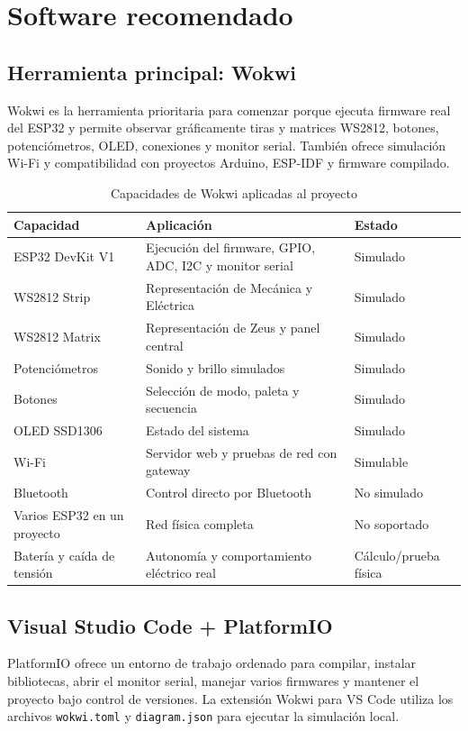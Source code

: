 \documentclass[11pt,a4paper]{article}
\begin{document}
\section{Software recomendado}
\subsection{Herramienta principal: Wokwi}
Wokwi es la herramienta prioritaria para comenzar porque ejecuta firmware real del ESP32 y permite observar gráficamente tiras y matrices WS2812, botones, potenciómetros, OLED, conexiones y monitor serial. También ofrece simulación Wi-Fi y compatibilidad con proyectos Arduino, ESP-IDF y firmware compilado. \cite{wokwi-home,wokwi-esp32,wokwi-strip,wokwi-matrix}

\begin{table}[H]
\centering
\caption{Capacidades de Wokwi aplicadas al proyecto}
\begin{tabularx}{\textwidth}{@{}P{3.5cm}Y P{3.2cm}@{}}
\toprule
\textbf{Capacidad} & \textbf{Aplicación} & \textbf{Estado}\\
\midrule
ESP32 DevKit V1 & Ejecución del firmware, GPIO, ADC, I2C y monitor serial & Simulado\\
WS2812 Strip & Representación de Mecánica y Eléctrica & Simulado\\
WS2812 Matrix & Representación de Zeus y panel central & Simulado\\
Potenciómetros & Sonido y brillo simulados & Simulado\\
Botones & Selección de modo, paleta y secuencia & Simulado\\
OLED SSD1306 & Estado del sistema & Simulado\\
Wi-Fi & Servidor web y pruebas de red con gateway & Simulable\\
Bluetooth & Control directo por Bluetooth & No simulado\\
Varios ESP32 en un proyecto & Red física completa & No soportado\\
Batería y caída de tensión & Autonomía y comportamiento eléctrico real & Cálculo/prueba física\\
\bottomrule
\end{tabularx}
\end{table}

\subsection{Visual Studio Code + PlatformIO}
PlatformIO ofrece un entorno de trabajo ordenado para compilar, instalar bibliotecas, abrir el monitor serial, manejar varios firmwares y mantener el proyecto bajo control de versiones. La extensión Wokwi para VS Code utiliza los archivos \texttt{wokwi.toml} y \texttt{diagram.json} para ejecutar la simulación local. \cite{platformio-vscode,wokwi-vscode,wokwi-config}
\end{document}
